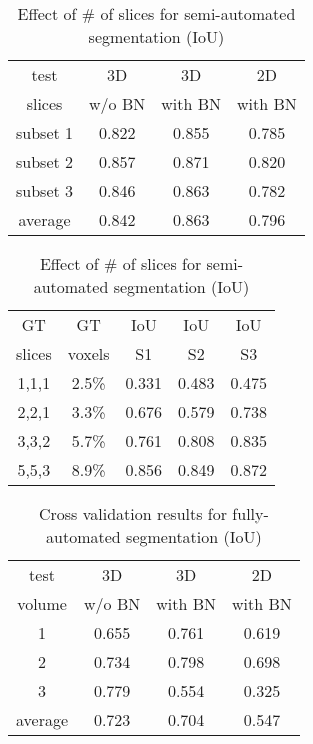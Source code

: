 \documentclass[runningheads,a4paper]{llncs}
\begin{document}
\begin{table}
\begin{minipage}{0.45\textwidth}
\centering
\caption{Cross validation results for semi-automated segmentation (IoU)}

\begin{tabular}{c@{~~}c@{~~}c@{~~}c} 
\hline
test & 3D & 3D  & 2D  \\
slices & w/o BN & with BN & with BN \\
\hline
subset 1 & 0.822 & 0.855 &  0.785  \\
subset 2 & 0.857 & 0.871 &  0.820  \\ 
subset 3 & 0.846 & 0.863 &  0.782  \\ \hline
average & 0.842 & 0.863 &  0.796  \\ 
\hline
\end{tabular}
\label{tab:cv_results}
\end{minipage}
\hfill
\begin{minipage}{0.45\textwidth}
\centering
\caption{Effect of \# of slices for semi-automated segmentation (IoU)}

\label{tab:numofslices}
\begin{tabular}{c@{~~}c@{~~}c@{~~}c@{~~}c} 
\hline
  GT    &   GT   & IoU & IoU & IoU \\
slices  & voxels & S1  & S2  & S3  \\
\hline
1,1,1 & 2.5\% & 0.331 & 0.483 & 0.475\\
2,2,1 & 3.3\% & 0.676 & 0.579 & 0.738\\ 
3,3,2 & 5.7\% & 0.761 & 0.808 & 0.835\\
5,5,3 & 8.9\% & 0.856 & 0.849 & 0.872\\
\hline
\end{tabular}
\end{minipage}
\end{table}
\begin{table}
\centering
\caption{Cross validation results for fully-automated segmentation (IoU)}

\label{tab:cv_results_naive}
\begin{tabular}{c@{~~~}c@{~~~}c@{~~~}c} 
\hline
test & 3D& 3D  & 2D \\
volume &  w/o BN   & with BN  & with BN  \\
\hline
1 & 0.655 & 0.761 & 0.619\\
2 & 0.734 & 0.798 & 0.698\\ 
3 & 0.779 & 0.554 & 0.325\\ \hline
average & 0.723 & 0.704 & 0.547\\
\hline
\end{tabular}
\end{table}
\end{document}
